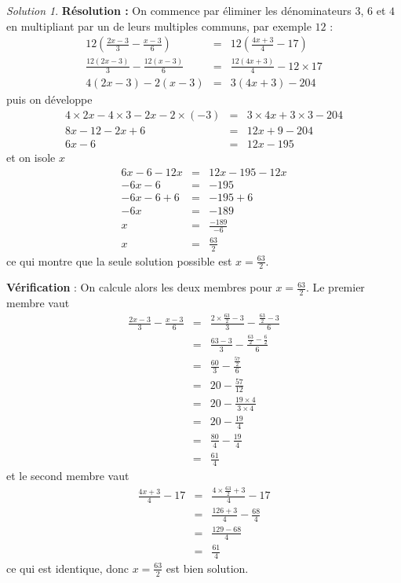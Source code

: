\documentclass[14pt]{article}
\theoremstyle{remark}
\newtheorem*{sol}{Solution}
\newcounter{n}
\theoremstyle{plain}
\begin{document}
\begin{sol}
\textbf{Résolution :} On commence par éliminer les dénominateurs $3$, $6$ et $4$ en multipliant par un de leurs multiples communs, par exemple $12$ : 
\begin{eqnarray*}
12\left(\frac{2x-3}3 - \frac{x-3}6\right)
&=& 12\left(\frac{4x+3}4 - 17\right)\\
\frac{12(2x-3)}3 - \frac{12(x-3)}6 
&=& \frac{12(4x+3)}4 - 12\times 17 \\
4(2x-3) - 2(x-3) &=& 3(4x+3) - 204
\end{eqnarray*} puis on développe
\begin{eqnarray*} 
4\times 2x-4\times3 - 2x-2 \times(-3) &=& 3\times 4x+3\times 3 - 204\\
8x - 12 -2x + 6 &=& 12x + 9 - 204\\
6x - 6 &=& 12x - 195
\end{eqnarray*}et on isole $x$
\begin{eqnarray*}
6x - 6-12x &=& 12x - 195-12x\\
-6x - 6 &=& -195 \\
-6x-6+6 &=& -195+6\\
-6x &=& -189 \\
x &=& \frac{-189}{-6} \\
x &=& \frac{63}2
\end{eqnarray*}
ce qui montre que la seule solution possible est $x=\frac{63}2$. 

\textbf{Vérification} : On calcule alors les deux membres pour $x=\frac{63}2$. Le premier membre vaut 
\begin{eqnarray*}\frac{2x-3}3 - \frac{x-3}6
&=& \frac{2\times\frac{63}2-3}3 - \frac{\frac{63}2-3}6\\
&=& \frac{63-3}3 - \frac{\frac{63}2-\frac62}6\\
&=& \frac{60}3 - \frac{\frac{57}2}6\\
&=& 20 - \frac{57}{12} \\
&=& 20 - \frac{19\times4}{3\times4}\\
&=& 20 - \frac{19}4 \\
&=& \frac{80}4-\frac{19}4 \\
&=& \frac{61}4
\end{eqnarray*}
et le second membre vaut 
\begin{eqnarray*}
\frac{4x+3}4 - 17&=& 
\frac{4\times\frac{63}2+3}4 - 17 \\
&=& \frac{126+3}4-\frac{68}4 \\
&=& \frac{129-68}4\\
&=& \frac{61}4
\end{eqnarray*} ce qui est identique, donc $x=\frac{63}2$ est bien solution.
\end{sol}
\end{document}
